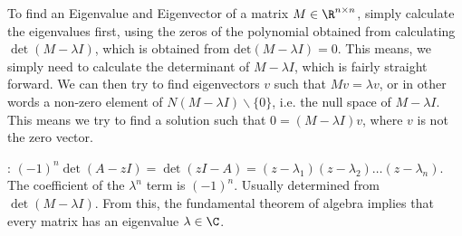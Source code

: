 To find an Eigenvalue and Eigenvector of a matrix $M \in \R^{n\times n}$, simply calculate the eigenvalues first, using the zeros of the polynomial obtained from calculating $\det(M - \lambda I)$, which is obtained from \shortproposition $\text{det}(M - \lambda I) = 0$. This means, we simply need to calculate the determinant of $M - \lambda I$, which is fairly straight forward. We can then try to find eigenvectors $v$ such that $Mv = \lambda v$, or in other words a non-zero element of $N(M - \lambda I)\backslash\{0\}$, i.e. the null space of $M - \lambda I$. This means we try to find a solution such that $0 = (M - \lambda I) v$, where $v$ is not the zero vector.

: $(-1)^n\det(A - z I) = \det(z I - A) = (z - \lambda_1)(z - \lambda_2)\ldots(z - \lambda_n)$.
The coefficient of the $\lambda^n$ term is $(-1)^n$. Usually determined from $\det(M - \lambda I)$.
\shorttheorem From this, the fundamental theorem of algebra implies that every matrix has an eigenvalue $\lambda \in \C$.


